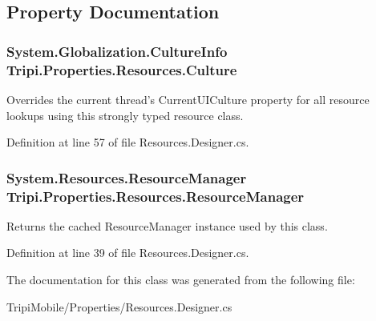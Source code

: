 \subsection{Property Documentation}
\hypertarget{class_tripi_1_1_properties_1_1_resources_a054adc4a9f974e93fa56b217b34c54f3}{
\subsubsection[{Culture}]{\setlength{\rightskip}{0pt plus 5cm}System.Globalization.CultureInfo Tripi.Properties.Resources.Culture}}
\label{class_tripi_1_1_properties_1_1_resources_a054adc4a9f974e93fa56b217b34c54f3}


Overrides the current thread's CurrentUICulture property for all resource lookups using this strongly typed resource class. 

Definition at line 57 of file Resources.Designer.cs.\hypertarget{class_tripi_1_1_properties_1_1_resources_a55e52bf169d41ab0d6b39c550af07dce}{
\subsubsection[{ResourceManager}]{\setlength{\rightskip}{0pt plus 5cm}System.Resources.ResourceManager Tripi.Properties.Resources.ResourceManager}}
\label{class_tripi_1_1_properties_1_1_resources_a55e52bf169d41ab0d6b39c550af07dce}


Returns the cached ResourceManager instance used by this class. 

Definition at line 39 of file Resources.Designer.cs.

The documentation for this class was generated from the following file:\begin{DoxyCompactItemize}
\item 
TripiMobile/Properties/Resources.Designer.cs\end{DoxyCompactItemize}
